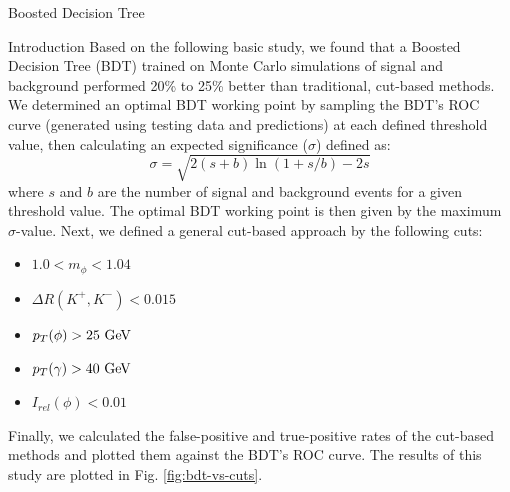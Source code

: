 \begin{section}{Boosted Decision Tree}
\begin{subsection}{Introduction}
Based on the following basic study, we found that a Boosted Decision Tree (BDT) trained on Monte Carlo simulations of signal and background performed 20\% to 25\% better than traditional, cut-based methods. We determined an optimal BDT working point by sampling the BDT's ROC curve (generated using testing data and predictions) at each defined threshold value, then calculating an expected significance ($\sigma$) defined as:
\begin{equation}
    \sigma = \sqrt{2(s+b)\ln(1+s/b)-2s}
\end{equation}
\noindent where $s$ and $b$ are the number of signal and background events for a given threshold value. The optimal BDT working point is then given by the maximum $\sigma$-value. Next, we defined a general cut-based approach by the following cuts:
\begin{itemize}
    \item $1.0 < m_{\phi} < 1.04$
    \item $\Delta R(K^{+}, K^{-}) < 0.015$
    \item $p_{T}(\phi) > 25\textnormal{ GeV}$
    \item $p_{T}(\gamma) > 40\textnormal{ GeV}$
    \item $I_{rel}(\phi) < 0.01$
\end{itemize}
\noindent Finally, we calculated the false-positive and true-positive rates of the cut-based methods and plotted them against the BDT's ROC curve. The results of this study are plotted in Fig. \ref{fig:bdt-vs-cuts}.


\end{subsection}
\end{section}
